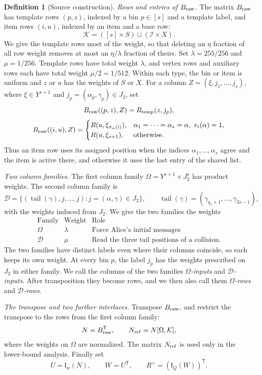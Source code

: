 \documentclass[11pt,letterpaper]{article} \usepackage[utf8]{inputenc}
\theoremstyle{plain} \newtheorem{theorem}{Theorem}[section]
\theoremstyle{definition} \newaliascnt{definition}{theorem}
\newtheorem{definition}[definition]{Definition} \aliascntresetthe{definition}
\newcommand{\Int}[2]{\mathsf{I}_{#1}(#2)}
\begin{document}
\begin{definition}[Source construction]
\smallskip\noindent\textit{Rows and entries of \(B_{\rm raw}\).}
The matrix \(B_{\rm raw}\) has template rows \((p,z)\), indexed by a bin
\(p\in[s]\) and a template label, and item rows \((i,u)\), indexed by an item
and a base row:
\[
\mathcal K=([s]\times S)\sqcup(\mathcal I\times X).
\]
We give the template rows most of the weight, so that deleting an \(\eta\)
fraction of all row weight removes at most an \(\eta/\lambda\) fraction of theirs.
Set \(\lambda=255/256\) and \(\mu=1/256\).
Template rows have total weight \(\lambda\), and vertex rows and auxiliary rows
each have total weight \(\mu/2=1/512\). Within each type, the bin or item is
uniform and \(z\) or \(u\) has the weights of \(S\) or \(X\).
For a column \(Z=(\xi,j_1,\ldots,j_s)\), where \(\xi\in Y^{s+1}\) and
\(j_p=(\alpha_p,\gamma_p)\in J_2\), set
\[
B_{\rm raw}((p,z),Z)=R_{\rm temp}(z,j_p),
\]
\[
B_{\rm raw}((i,u),Z)=
 \begin{cases}
 R(u,\xi_{\pi_\alpha(i)}),
   &\alpha_1=\cdots=\alpha_s=\alpha,\ v_i(\alpha)=1,\\
 R(u,\xi_{s+1}),&\text{otherwise}.
 \end{cases}
\]
Thus an item row uses its assigned position when the indices
\(\alpha_1,\ldots,\alpha_s\) agree and the item is active there, and otherwise
it uses the last entry of the shared list.

\smallskip\noindent\textit{Two column families.}
The first column family \(\Omega=Y^{s+1}\times J_2^s\) has product weights.
The second column family is
\[
\mathcal D = \{(\operatorname{tail}(\gamma),j,\ldots,j):j=(\alpha,\gamma)\in
J_2\}, \qquad \operatorname{tail}(\gamma)=(\gamma_{q_1+1},\ldots,\gamma_{2s-1}),
\]
with the weights induced from \(J_2\). We give the two families
the weights
\[
\begin{array}{ccl}
\text{Family}&\text{Weight}&\text{Role}\\
\Omega&\lambda&\text{Force Alice's initial messages}\\
\mathcal D&\mu&\text{Read the three tail positions of a collision}.
\end{array}
\]
The two families have distinct labels even where their columns coincide,
so each keeps its own weight. At every bin \(p\), the label \(j_p\) has the weights prescribed on \(J_2\) in
either family. We call the columns of the two families \emph{$\Omega$-inputs} and
\emph{$\mathcal D$-inputs}. After transposition they become rows, and we
then also call them \emph{$\Omega$-rows} and \emph{$\mathcal D$-rows}.

\smallskip\noindent\textit{The transpose and two further interlaces.}
Transpose \(B_{\rm raw}\), and restrict the transpose to the rows from the
first column family:
\[
N=B_{\rm raw}^{\mathsf T},\qquad
N_{\rm ref}=N[\Omega,\mathcal K],
\]
where the weights on \(\Omega\) are normalized. The matrix \(N_{\rm ref}\) is used only in
the lower-bound analysis. Finally set
\[
U=\Int{w}{N},\qquad W=U^{\mathsf T},\qquad
R^+=(\Int{Q}{W})^{\mathsf T}.
\]
\end{definition}
\end{document}
